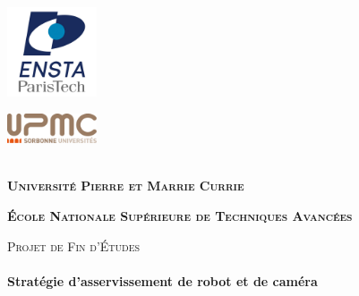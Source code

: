 \begin{titlepage}

	\begin{center}
	
		\begin{minipage}{0.45\textwidth}
		\begin{flushleft}
			\includegraphics[width=100px]{enstalogo.png}
		\end{flushleft}
		\end{minipage}
		\begin{minipage}{0.45\textwidth}
		\begin{flushright}
			\includegraphics[width=100px]{upmclogo.png}
		\end{flushright}
		\end{minipage}
		\mbox{}\\[1.5cm] 

		\textbf{ \textsc{\Large Université Pierre et Marrie Currie}\\[0.5cm] }
		
		\textbf{ \textsc{\Large École Nationale Supérieure de Techniques Avancées}\\[0.5cm]}
		
		\vfill
	
		\textsc{\large Projet de Fin d'Études}\\[0.5cm]
	
		\HRule \\[0.4cm]
		{ \huge \bfseries Stratégie d'asservissement de robot et de caméra}\\[0.15cm]
	
		      \HRule \\[1.5cm]
	                

\end{center}
\end{titlepage}
